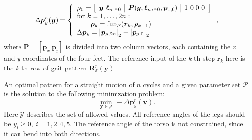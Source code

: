 \documentclass[10pt,a4paper]{article}
\begin{document}
\begin{equation}
\Delta\bm{p}_y^n(\bm{y})
 = 
\left\lbrace
\begin{array}{l}
\bm{\rho}_0 = 
\left[
\begin{array}{c|c|c}
\bm{y} ~ \bm{\ell}_n ~ \varepsilon_0  & 
\bm{P}(\bm{y}, \bm{\ell}_n, \varepsilon_0, \bm{p}_{1,0}) & 
1~0~0~0
\end{array}
\right] \\

\textnormal{for } k = 1, \dots, 2n: \\
\qquad \bm{\rho}_k = \textnormal{fun}_{\mathcal{P}}(\bm{r}_k, \bm{\rho}_{k-1}) \\

\Delta\bm{p}_y = \big| \bm{p}_{y, 2n} \big|_2 - \big| \bm{p}_{y,0} \big|_2 \\
\end{array}
\right. ,
\end{equation}
where $\bm{P} = [\bm{p}_x~\bm{p}_y]$ is divided into two column vectors, each containing the $x$ and $y$ coordinates of the four feet.
The reference input of the $k$-th step $\bm{r}_k$ here is the $k$-th row of gait pattern $\bm{R}_\mathcal{S}^n(\bm{y})$.


An optimal pattern for a straight motion of $n$ cycles and a given parameter set $\mathcal{P}$ is the solution to the following minimization problem:
\begin{equation}
\min_{\bm{y} \in \mathcal{Y}} ~ -\Delta\bm{p}_y^n(\bm{y}).
\end{equation}
Here $\mathcal{Y}$ describes the set of allowed values.
All reference angles of the legs should be $y_i\geq0,~i=1,2,4,5$. 
The reference angle of the torso is not constrained, since it can bend into both directions.


\end{document}
